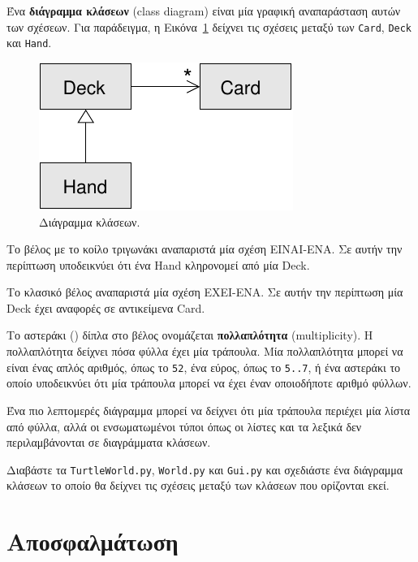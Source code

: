 \documentclass[10pt]{book}
\begin{document}
Ένα {\bf διάγραμμα κλάσεων} (class diagram) είναι μία γραφική αναπαράσταση αυτών των σχέσεων.
Για παράδειγμα, η Εικόνα~\ref{fig.class1} δείχνει τις σχέσεις μεταξύ των {\tt Card}, {\tt Deck} και {\tt Hand}.  


\begin{figure}
\centerline
{\includegraphics[scale=0.8]{figs/class1.pdf}}
\caption {Διάγραμμα κλάσεων.}
\label{fig.class1}
\end{figure}


Το βέλος με το κοίλο τριγωνάκι αναπαριστά μία σχέση ΕΙΝΑΙ-ΕΝΑ.  Σε αυτήν την 
περίπτωση υποδεικνύει ότι ένα Hand κληρονομεί από μία Deck.

Το κλασικό βέλος αναπαριστά μία σχέση ΕΧΕΙ-ΕΝΑ. Σε αυτήν την περίπτωση μία
Deck έχει αναφορές σε αντικείμενα Card.

Το αστεράκι ({\tt *}) δίπλα στο βέλος ονομάζεται {\bf πολλαπλότητα} (multiplicity).
Η πολλαπλότητα δείχνει πόσα φύλλα έχει μία τράπουλα.  Μία πολλαπλότητα μπορεί να είναι
ένας απλός αριθμός, όπως το {\tt 52}, ένα εύρος, όπως το {\tt 5..7}, ή ένα αστεράκι 
το οποίο υποδεικνύει ότι μία τράπουλα μπορεί να έχει έναν οποιοδήποτε αριθμό φύλλων.

Ένα πιο λεπτομερές διάγραμμα μπορεί να δείχνει ότι μία τράπουλα περιέχει μία λίστα 
από φύλλα, αλλά οι ενσωματωμένοι τύποι όπως οι λίστες και τα λεξικά δεν περιλαμβάνονται 
σε διαγράμματα κλάσεων.
\\

\begin{exercise}

Διαβάστε τα {\tt TurtleWorld.py}, {\tt World.py} και {\tt Gui.py} και 
σχεδιάστε ένα διάγραμμα κλάσεων το οποίο θα δείχνει τις σχέσεις μεταξύ των κλάσεων που 
ορίζονται εκεί.

\end{exercise}


\section{Αποσφαλμάτωση}
\end{document}
